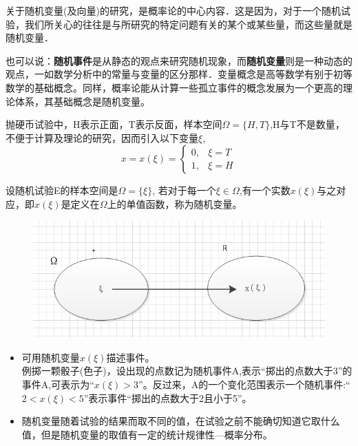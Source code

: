 \begin{frame}
关于随机变量(及向量)的研究，是概率论的中心内容．这是因为，对于一个随机试验，我们所关心的往往是与所研究的特定问题有关的某个或某些量，而这些量就是随机变量．

也可以说：\textbf{随机事件}是从静态的观点来研究随机现象，而\textbf{随机变量}则是一种动态的观点，一如数学分析中的常量与变量的区分那样．变量概念是高等数学有别于初等数学的基础概念。同样，概率论能从计算一些孤立事件的概念发展为一个更高的理论体系，其基础概念是随机变量。
\end{frame}

\begin{frame}
\begin{example}
	抛硬币试验中，H表示正面，T表示反面，样本空间$\Omega=\{H,T\}$,H与T不是数量，不便于计算及理论的研究，因而引入以下变量$\xi$,
	$$x=x(\xi)=
	\begin{cases}
	0, &\xi=T\\
	1, &\xi=H
	\end{cases}
	$$
\end{example}  
\end{frame}

\begin{frame}
\begin{definition}[随机变量]
设随机试验E的样本空间是$\Omega=\{\xi\}$, 若对于每一个$\xi\in\Omega$,有一个实数$x(\xi)$与之对应，即$x(\xi)$是定义在$\Omega$上的单值函数，称为随机变量。
\end{definition}
\begin{figure}[htbp]
\includegraphics[scale=0.3]{xi_map}
\end{figure}
\begin{itemize}
\item 可用随机变量$x(\xi)$描述事件。\\
例掷一颗骰子(色子)，设出现的点数记为随机事件A,表示``掷出的点数大于3''的事件A,可表示为``$x(\xi)>3$''。反过来，A的一个变化范围表示一个随机事件:``$2<x(\xi)<5$''表示事件``掷出的点数大于2且小于5''。
\item 随机变量随着试验的结果而取不同的值，在试验之前不能确切知道它取什么值，但是随机变量的取值有一定的统计规律性---概率分布。
\end{itemize}
\end{frame}


